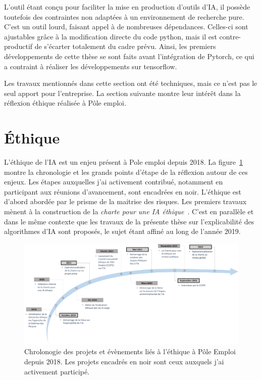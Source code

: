 L'outil étant conçu pour faciliter la mise en production d'outils d'IA, il possède toutefois des contraintes non adaptées à un environnement de recherche pure. C'est un outil lourd, faisant appel à de nombreuses dépendances. Celles-ci sont ajustables grâce à la modification directe du code python, mais il est contre-productif de s'écarter totalement du cadre prévu. Ainsi, les premiers développements de cette thèse se sont faits avant l'intégration de Pytorch, ce qui a contraint à réaliser les développements sur tensorflow.

Les travaux mentionnés dans cette section ont été techniques, mais ce n'est pas le seul apport pour l'entreprise. La section suivante montre leur intérêt dans la réflexion éthique réalisée à Pôle emploi.

\section{\'Ethique} \label{C6:ethique}

L'éthique de l'IA est un enjeu présent à Pole emploi depuis 2018. La figure~\ref{fig:chronologie_ethique}  montre la chronologie et les grands points d'étape de la réflexion autour de ces enjeux. Les étapes auxquelles j'ai activement contribué, notamment en participant aux réunions d'avancement, sont encadrées en noir. L'éthique est d'abord abordée par le prisme de la maitrise des risques. Les premiers travaux mènent à la construction de la \textit{charte pour une IA éthique}~\cite{Pole2022}. C'est en parallèle et dans le même contexte que les travaux de la présente thèse sur l'explicabilité des algorithmes d'IA sont proposés, le sujet étant affiné au long de l'année 2019.

\begin{figure}[htpb!] %
\centering
\includegraphics[width=\textwidth]{S5-Presentation_du_template_nlp/figures/ethique_chrono.png}
\caption{ Chrolonogie des projets et évènements liés à l'éthique à Pôle Emploi depuis 2018. Les projets encadrés en noir sont ceux auxquels j'ai activement participé.}
\label{fig:chronologie_ethique}
\end{figure}

